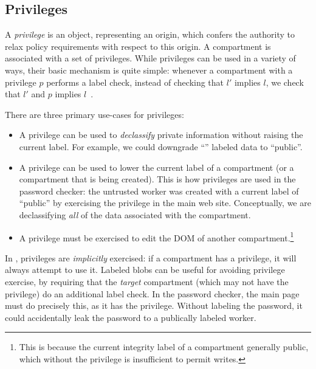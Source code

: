 \subsection{Privileges}
\label{sec:privileges}

A \emph{privilege} is an object, representing an origin, which confers
the authority to relax policy requirements with respect to this origin.
%
A compartment is associated with a set of privileges.
%
While privileges can be used in a variety of ways, their basic mechanism
is quite simple:  whenever a compartment with a privilege $p$ performs a
label check, instead of checking that $l'$ implies $l$, we check that
$l'$ and $p$ implies $l$~\cite{stefan:2011:dclabels}.

There are three primary use-cases for privileges:

\begin{itemize}
    \item A privilege can be used to \emph{declassify} private
        information without raising the current label.  For example, we
        could downgrade ``'' labeled data to
        ``public''.

    \item A privilege can be used to lower the current label of
        a compartment (or a compartment that is being created).
        This is how privileges are used
        in the password checker: the untrusted worker was created
        with a current label of ``public'' by exercising the
         privilege in the main web site.  Conceptually, we
        are declassifying \emph{all} of the data associated with the
        compartment.

    \item A privilege must be exercised to edit the DOM
        of another compartment.\footnote{This is because the current
        integrity label of a compartment generally public, which
        without the privilege is insufficient to permit writes.}
\end{itemize}

In \sys{}, privileges are \emph{implicitly} exercised: if a compartment
has a privilege, it will always attempt to use it.
%
Labeled blobs can be useful for avoiding privilege exercise, by
requiring that the \emph{target} compartment (which may not have
the privilege) do an additional label check.
%
In the password checker, the main
page must do precisely this, as it has the  privilege.
%
Without labeling the password, it could accidentally leak the password
to a publically labeled worker.

